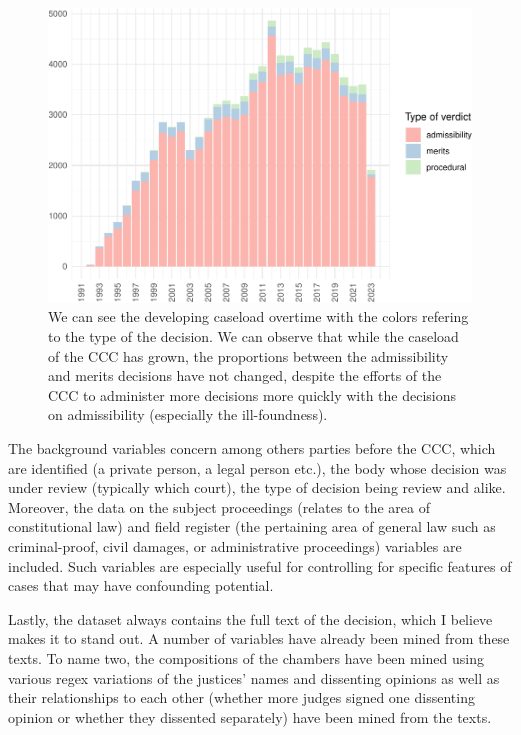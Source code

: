 \documentclass[
  11pt,
]{article}
\begin{document}
\begin{figure}
\centering
\includegraphics{apex_courts_dataset_files/figure-latex/caseload-1.pdf}
\caption{We can see the developing caseload overtime with the colors
refering to the type of the decision. We can observe that while the
caseload of the CCC has grown, the proportions between the admissibility
and merits decisions have not changed, despite the efforts of the CCC to
administer more decisions more quickly with the decisions on
admissibility (especially the ill-foundness).}
\end{figure}

The background variables concern among others parties before the CCC,
which are identified (a private person, a legal person etc.), the body
whose decision was under review (typically which court), the type of
decision being review and alike. Moreover, the data on the subject
proceedings (relates to the area of constitutional law) and field
register (the pertaining area of general law such as criminal-proof,
civil damages, or administrative proceedings) variables are included.
Such variables are especially useful for controlling for specific
features of cases that may have confounding potential.

Lastly, the dataset always contains the full text of the decision, which
I believe makes it to stand out. A number of variables have already been
mined from these texts. To name two, the compositions of the chambers
have been mined using various regex variations of the justices' names
and dissenting opinions as well as their relationships to each other
(whether more judges signed one dissenting opinion or whether they
dissented separately) have been mined from the texts.
\end{document}
